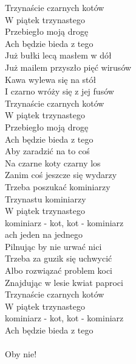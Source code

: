 \begin{text}
\vin Trzynaście czarnych kotów\\
\vin W piątek trzynastego\\
\vin Przebiegło moją drogę\\
\vin Ach będzie bieda z tego\\

Już bułki lecą masłem w dół\\
Już mailem przyszło pięć wirusów\\
Kawa wylewa się na stół\\
I czarno wróży się z jej fusów\\

\vin Trzynaście czarnych kotów\\
\vin W piątek trzynastego\\
\vin Przebiegło moją drogę\\
\vin Ach będzie bieda z tego\\

Aby zaradzić na to coś\\
Na czarne koty czarny los\\
Zanim coś jeszcze się wydarzy\\
Trzeba poszukać kominiarzy\\

\vin Trzynastu kominiarzy\\
\vin W piątek trzynastego\\
\vin kominiarz - kot, kot - kominiarz\\
\vin ach jeden na jednego\\

Pilnując by nie urwać nici\\
Trzeba za guzik się uchwycić\\
Albo rozwiązać problem koci\\
Znajdując w lesie kwiat paproci\\

\vin Trzynaście czarnych kotów\\
\vin W piątek trzynastego\\
\vin kominiarz - kot, kot - kominiarz\\
\vin Ach będzie bieda z tego\\
\vin \\
\vin Oby nie!
\end{text}
